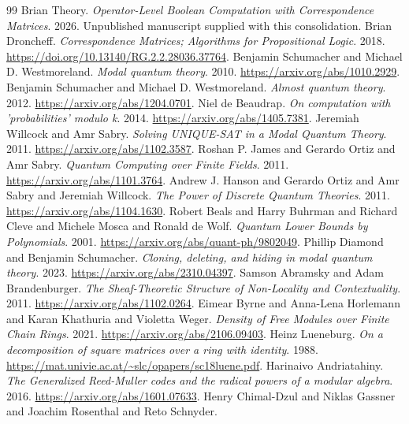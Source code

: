 \begin{thebibliography}{99}
Brian Theory.
\emph{Operator-Level Boolean Computation with Correspondence Matrices}. 2026.
Unpublished manuscript supplied with this consolidation.
Brian Droncheff.
\emph{Correspondence Matrices; Algorithms for Propositional Logic}. 2018.
\url{https://doi.org/10.13140/RG.2.2.28036.37764}.
Benjamin Schumacher and Michael D. Westmoreland.
\emph{Modal quantum theory}. 2010.
\url{https://arxiv.org/abs/1010.2929}.
Benjamin Schumacher and Michael D. Westmoreland.
\emph{Almost quantum theory}. 2012.
\url{https://arxiv.org/abs/1204.0701}.
Niel de Beaudrap.
\emph{On computation with 'probabilities' modulo k}. 2014.
\url{https://arxiv.org/abs/1405.7381}.
Jeremiah Willcock and Amr Sabry.
\emph{Solving UNIQUE-SAT in a Modal Quantum Theory}. 2011.
\url{https://arxiv.org/abs/1102.3587}.
Roshan P. James and Gerardo Ortiz and Amr Sabry.
\emph{Quantum Computing over Finite Fields}. 2011.
\url{https://arxiv.org/abs/1101.3764}.
Andrew J. Hanson and Gerardo Ortiz and Amr Sabry and Jeremiah Willcock.
\emph{The Power of Discrete Quantum Theories}. 2011.
\url{https://arxiv.org/abs/1104.1630}.
Robert Beals and Harry Buhrman and Richard Cleve and Michele Mosca and Ronald de Wolf.
\emph{Quantum Lower Bounds by Polynomials}. 2001.
\url{https://arxiv.org/abs/quant-ph/9802049}.
Phillip Diamond and Benjamin Schumacher.
\emph{Cloning, deleting, and hiding in modal quantum theory}. 2023.
\url{https://arxiv.org/abs/2310.04397}.
Samson Abramsky and Adam Brandenburger.
\emph{The Sheaf-Theoretic Structure of Non-Locality and Contextuality}. 2011.
\url{https://arxiv.org/abs/1102.0264}.
Eimear Byrne and Anna-Lena Horlemann and Karan Khathuria and Violetta Weger.
\emph{Density of Free Modules over Finite Chain Rings}. 2021.
\url{https://arxiv.org/abs/2106.09403}.
Heinz Lueneburg.
\emph{On a decomposition of square matrices over a ring with identity}. 1988.
\url{https://mat.univie.ac.at/~slc/opapers/sc18luene.pdf}.
Harinaivo Andriatahiny.
\emph{The Generalized Reed-Muller codes and the radical powers of a modular algebra}. 2016.
\url{https://arxiv.org/abs/1601.07633}.
Henry Chimal-Dzul and Niklas Gassner and Joachim Rosenthal and Reto Schnyder.

\end{thebibliography}
